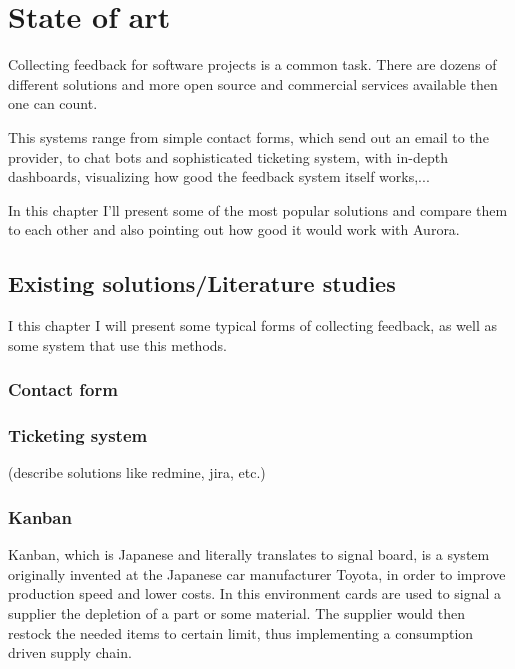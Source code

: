\chapter{State of art}

Collecting feedback for software projects is a common task. There are dozens of different solutions and more open source and commercial services available then one can count.

This systems range from simple contact forms, which send out an email to the provider, to chat bots and sophisticated ticketing system, with in-depth dashboards, visualizing how good the feedback system itself works,... 

In this chapter I'll present some of the most popular solutions and compare them to each other and also pointing out how good it would work with Aurora.

\section{Existing solutions/Literature studies}

I this chapter I will present some typical forms of collecting feedback, as well as some system that use this methods.

\subsection{Contact form} 

\subsection{Ticketing system}

(describe solutions like redmine, jira, etc.)

\subsection{Kanban}

Kanban, which is Japanese and literally translates to signal board, is a system  originally invented at the Japanese car manufacturer Toyota, in order to improve production speed and lower costs. In this environment cards are used to signal a supplier the depletion of a part or some material. The supplier would then restock the needed items to certain limit, thus implementing a consumption driven supply chain.

